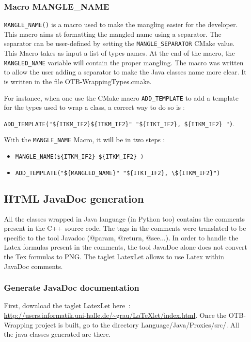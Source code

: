 \subsubsection{Macro MANGLE\_NAME}
\verb!MANGLE_NAME()! is a macro used to make the mangling easier for the developer. 
This macro aims at formatting the mangled name using a separator. The separator can be user-defined by
setting the \verb!MANGLE_SEPARATOR! CMake value. This Macro takes as input a  list of types names.
At the end of the macro, the \verb!MANGLED_NAME! variable will contain the proper mangling. 
The macro was written to allow the user adding a separator to make the Java classes name more clear.
It is written in the file OTB-WrappingTypes.cmake. 

For instance, when one use the CMake macro \verb!ADD_TEMPLATE! to add a template 
for the types used to wrap a class, a correct way to do so is :

\verb!ADD_TEMPLATE("${ITKM_IF2}${ITKM_IF2}" "${ITKT_IF2}, ${ITKM_IF2} ")!.

With the \verb!MANGLE_NAME! Macro, it will be in two steps : 
\begin{itemize}
\item\verb!MANGLE_NAME(${ITKM_IF2} ${ITKM_IF2} )!
\item\verb!ADD_TEMPLATE("${MANGLED_NAME}" "${ITKT_IF2}, \${ITKM_IF2}")!
\end{itemize}

\subsection{HTML JavaDoc generation}

All the classes wrapped in Java language (in Python too) contains the comments 
present in the C++ source code. The tags in the comments were translated to be 
specific to the tool Javadoc (@param, @return, @see...). 
In order to handle the Latex formulas present in the comments, the tool JavaDoc alone 
does not convert the Tex formulas to PNG. The taglet LatexLet allows to use Latex within 
JavaDoc comments. 

\subsubsection{Generate JavaDoc documentation}

First, download the taglet LatexLet 
here~:\\ \url{http://users.informatik.uni-halle.de/~grau/LaTeXlet/index.html}. 
Once the OTB-Wrapping project is built, go to the directory Language/Java/Proxies/src/. 
All the java classes generated are there.

